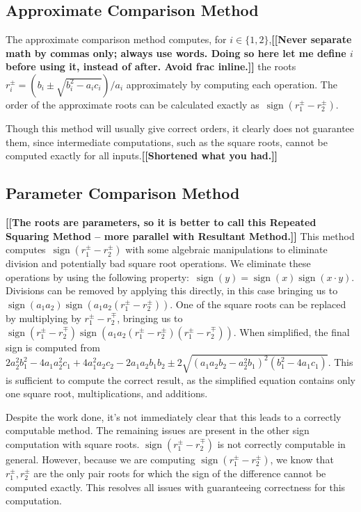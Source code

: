 \documentclass{cccg16}
\DeclareMathOperator{\sign}{sign}
\def\Jack#1{{\bf [[#1]]}\ignorespaces}
\begin{document}
\subsection{Approximate Comparison Method}
The approximate comparison method computes, for $i\in\{1, 2\}$,\Jack{Never separate math by commas only; always use words.  Doing so here let me define $i$ before using it, instead of after. Avoid frac inline.} the
roots~$r_i^\pm=({b_i\pm\sqrt{b_i^2-a_ic_i}})/{a_i}$
approximately by computing each operation.  The order of
the approximate roots can be calculated exactly as~$\sign(r_1^\pm-r_2^\pm)$.

Though this method will usually give correct orders, it clearly does not guarantee them, since intermediate computations, such as the square roots,  cannot be computed
exactly for all inputs.\Jack{Shortened what you had.}


\subsection{Parameter Comparison Method}\Jack{The roots are parameters, so it is better to call this Repeated Squaring Method -- more parallel with Resultant Method.}
This method computes~$\sign(r_1^\pm-r_2^\pm)$ with some algebraic
manipulations to eliminate division and potentially bad square root
operations.  We eliminate these operations by using the following
property:~$\sign(y)=\sign(x)\sign(x\cdot y)$.  Divisions can be
removed by applying this directly, in this case bringing us
to~$\sign(a_1 a_2)\sign(a_1 a_2 (r_1^\pm-r_2^\pm))$.  One of the
square roots can be replaced by multiplying by $r_1^\pm-r_2^\mp$,
bringing us to~$\sign(r_1^\pm-r_2^\mp)\sign(a_1 a_2 (r_1^\pm -
r_2^\pm) (r_1^\pm - r_2^\mp))$.  When simplified, the final sign is
computed from~$2a_2^2b_1^2-4a_1a_2^2c_1+4a_1^2a_2c_2-2a_1a_2b_1b_2\pm
2 \sqrt{(a_1a_2b_2-a_2^2b_1)^2(b_1^2-4a_1c_1)}$. This is sufficient to
compute the correct result, as the simplified equation contains only
one square root, multiplications, and additions.

Despite the work done, it's not immediately clear that this leads to a
correctly computable method.  The remaining issues are present in the
other sign computation with square roots. $\sign(r_1^\pm-r_2^\mp)$ is
not correctly computable in general.  However, because we are
computing $\sign(r_1^\pm-r_2^\pm)$, we know that $r_1^\pm, r_2^\pm$
are the only pair roots for which the sign of the difference cannot be
computed exactly.  This resolves all issues with guaranteeing
correctness for this computation.
\end{document}
